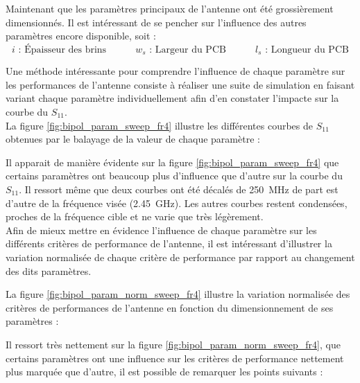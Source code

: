 \documentclass[Deriaz_Traiber_Labo02]{subfiles}
\begin{document}
Maintenant que les paramètres principaux de l'antenne ont été grossièrement dimensionnés. Il est intéressant de se pencher sur l'influence des autres paramètres encore disponible, soit :
$$
i \text{ : Épaisseur des brins} \quad \quad \quad w_s \text{ : Largeur du PCB} \quad \quad \quad l_s \text{ : Longueur du PCB}
$$

Une méthode intéressante pour comprendre l'influence de chaque paramètre sur les performances de l'antenne consiste à réaliser une suite de simulation en faisant variant chaque paramètre individuellement afin d'en constater l'impacte sur la courbe du $S_{11}$.\\

La figure \ref{fig:bipol_param_sweep_fr4} illustre les différentes courbes de $S_{11}$ obtenues par le balayage de la valeur de chaque paramètre :


Il apparait de manière évidente sur la figure \ref{fig:bipol_param_sweep_fr4} que certains paramètres ont beaucoup plus d'influence que d'autre sur la courbe du $S_{11}$. Il ressort même que deux courbes ont été décalés de \SI{250}{\mega\hertz} de part est d'autre de la fréquence visée (\SI{2.45}{\giga\hertz}). Les autres courbes restent condensées, proches de la fréquence cible et ne varie que très légèrement.\\

Afin de mieux mettre en évidence l'influence de chaque paramètre sur les différents critères de performance de l'antenne, il est intéressant d'illustrer la variation normalisée de chaque critère de performance par rapport au changement des dits paramètres.\\

\pagebreak

La figure \ref{fig:bipol_param_norm_sweep_fr4} illustre la variation normalisée des critères de performances de l'antenne en fonction du dimensionnement de ses paramètres :


Il ressort très nettement sur la figure \ref{fig:bipol_param_norm_sweep_fr4}, que certains paramètres ont une influence sur les critères de performance nettement plus marquée que d'autre, il est possible de remarquer les points suivants :\\
\end{document}
